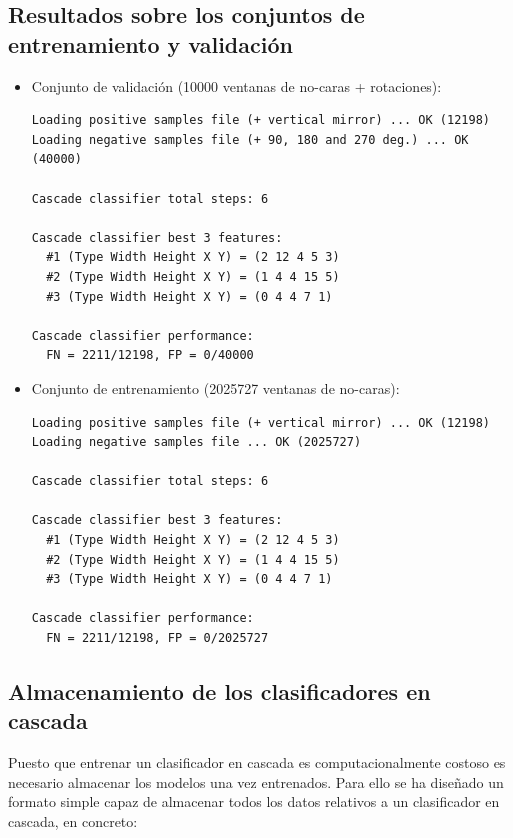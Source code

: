 \documentclass[11pt,spanish,a4paper]{article} %
\begin{document}
\subsection{Resultados sobre los conjuntos de entrenamiento y validación}

\begin{itemize}
\item Conjunto de validación (10000 ventanas de no-caras + rotaciones):

\begin{verbatim}
Loading positive samples file (+ vertical mirror) ... OK (12198)
Loading negative samples file (+ 90, 180 and 270 deg.) ... OK (40000)

Cascade classifier total steps: 6

Cascade classifier best 3 features:
  #1 (Type Width Height X Y) = (2 12 4 5 3)
  #2 (Type Width Height X Y) = (1 4 4 15 5)
  #3 (Type Width Height X Y) = (0 4 4 7 1)

Cascade classifier performance:
  FN = 2211/12198, FP = 0/40000
\end{verbatim}

\item Conjunto de entrenamiento (2025727 ventanas de no-caras):

\begin{verbatim}
Loading positive samples file (+ vertical mirror) ... OK (12198)
Loading negative samples file ... OK (2025727)

Cascade classifier total steps: 6

Cascade classifier best 3 features:
  #1 (Type Width Height X Y) = (2 12 4 5 3)
  #2 (Type Width Height X Y) = (1 4 4 15 5)
  #3 (Type Width Height X Y) = (0 4 4 7 1)

Cascade classifier performance:
  FN = 2211/12198, FP = 0/2025727
\end{verbatim}

\end{itemize}

\subsection{Almacenamiento de los clasificadores en cascada}

Puesto que entrenar un clasificador en cascada es computacionalmente costoso es necesario almacenar los modelos una vez entrenados. Para ello se ha diseñado un formato simple capaz de almacenar todos los datos relativos a un clasificador en cascada, en concreto:
\end{document}
